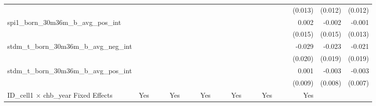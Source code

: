 \begin{tabular}{lrrrrrrrrrrrrrrrrrr}
                                            &              &              &              &              &              &              &              &              &               &              &              &               &              &              &               &      (0.013) &      (0.012) &       (0.012) \\ 
spi1\_born\_30m36m\_b\_avg\_pos\_int        &              &              &              &              &              &              &              &              &               &              &              &               &              &              &               &        0.002 &       -0.002 &        -0.001 \\ 
                                            &              &              &              &              &              &              &              &              &               &              &              &               &              &              &               &      (0.015) &      (0.015) &       (0.013) \\ 
stdm\_t\_born\_30m36m\_b\_avg\_neg\_int     &              &              &              &              &              &              &              &              &               &              &              &               &              &              &               &       -0.029 &       -0.023 &        -0.021 \\ 
                                            &              &              &              &              &              &              &              &              &               &              &              &               &              &              &               &      (0.020) &      (0.019) &       (0.019) \\ 
stdm\_t\_born\_30m36m\_b\_avg\_pos\_int     &              &              &              &              &              &              &              &              &               &              &              &               &              &              &               &        0.001 &       -0.003 &        -0.003 \\ 
                                            &              &              &              &              &              &              &              &              &               &              &              &               &              &              &               &      (0.009) &      (0.008) &       (0.007) \\ 
\midrule
ID\_cell1 $\times$ chb\_year Fixed Effects  &          Yes &              &              &          Yes &              &              &          Yes &              &               &          Yes &              &               &          Yes &              &               &          Yes &              &               \\ 

\end{tabular}
